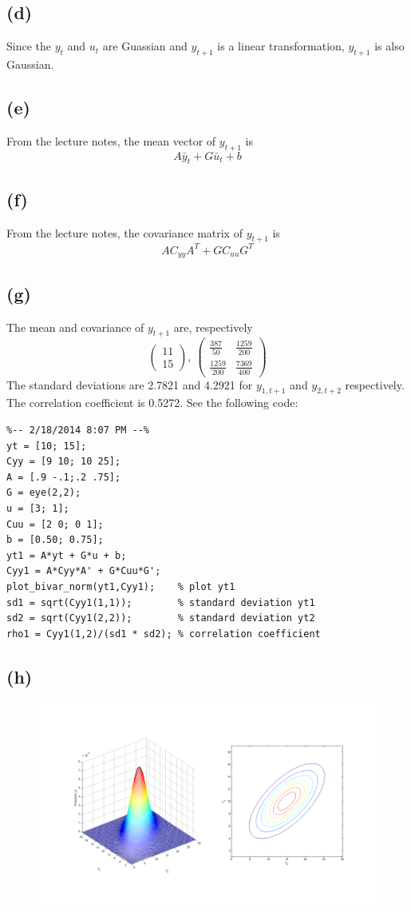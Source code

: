 \documentclass[fleqn, letterpaper]{tufte-handout}
\begin{document}
\subsection{(d)}
Since the $y_t$ and $u_t$ are Guassian and $y_{t+1}$ is a linear transformation, $y_{t+1}$ is also Gaussian.
\subsection{(e)}
From the lecture notes, the mean vector of $y_{t+1}$ is
\[A\bar y_t + G\bar u_t + b
\]
\subsection{(f)}
From the lecture notes, the covariance matrix of $y_{t+1}$ is
\[AC_{yy}A^T + GC_{uu}G^T
\]
\subsection{(g)}
The mean and  covariance of $y_{t+1}$ are, respectively
\[
\left(\begin{array}{c} 11\\ 15 \end{array}\right),\ 
\left(\begin{array}{cc} \frac{387}{50} & \frac{1259}{200}\\ \frac{1259}{200} & \frac{7369}{400} \end{array}\right)
\]
The standard deviations are 2.7821 and 4.2921 for $y_{1,t+1}$ and $y_{2,t+2}$ respectively. The correlation coefficient is 0.5272. See the following code:
\begin{verbatim}
%-- 2/18/2014 8:07 PM --%
yt = [10; 15];
Cyy = [9 10; 10 25];
A = [.9 -.1;.2 .75];
G = eye(2,2);
u = [3; 1];
Cuu = [2 0; 0 1];
b = [0.50; 0.75];
yt1 = A*yt + G*u + b;
Cyy1 = A*Cyy*A' + G*Cuu*G';
plot_bivar_norm(yt1,Cyy1);    % plot yt1
sd1 = sqrt(Cyy1(1,1));        % standard deviation yt1
sd2 = sqrt(Cyy1(2,2));        % standard deviation yt2
rho1 = Cyy1(1,2)/(sd1 * sd2); % correlation coefficient
\end{verbatim}
\subsection{(h)}
\begin{figure}[h!]
        \includegraphics[width=\textwidth]{ps2plot2}
\end{figure}
\end{document}

